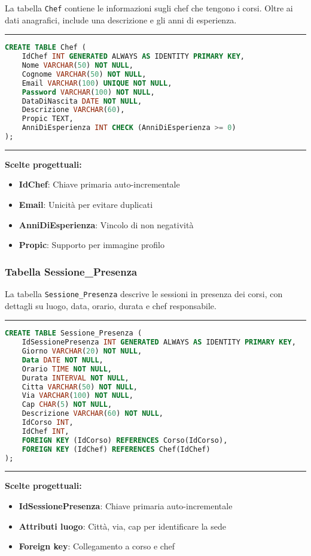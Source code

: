 La tabella \texttt{Chef} contiene le informazioni sugli chef che tengono i corsi. Oltre ai dati anagrafici, include una descrizione e gli anni di esperienza.

\noindent\rule{\textwidth}{0.4pt}
\begin{lstlisting}[language=SQL, style=sqlstyle]
CREATE TABLE Chef (
    IdChef INT GENERATED ALWAYS AS IDENTITY PRIMARY KEY,
    Nome VARCHAR(50) NOT NULL,
    Cognome VARCHAR(50) NOT NULL,
    Email VARCHAR(100) UNIQUE NOT NULL,
    Password VARCHAR(100) NOT NULL,
    DataDiNascita DATE NOT NULL,
    Descrizione VARCHAR(60),
    Propic TEXT,
    AnniDiEsperienza INT CHECK (AnniDiEsperienza >= 0)
);
\end{lstlisting}
\noindent\rule{\textwidth}{0.4pt}

\textbf{Scelte progettuali:}
\begin{itemize}
    \item \textbf{IdChef}: Chiave primaria auto-incrementale
    \item \textbf{Email}: Unicità per evitare duplicati
    \item \textbf{AnniDiEsperienza}: Vincolo di non negatività
    \item \textbf{Propic}: Supporto per immagine profilo
\end{itemize}

\subsubsection{Tabella Sessione\_Presenza}

La tabella \texttt{Sessione\_Presenza} descrive le sessioni in presenza dei corsi, con dettagli su luogo, data, orario, durata e chef responsabile.

\noindent\rule{\textwidth}{0.4pt}
\begin{lstlisting}[language=SQL, style=sqlstyle]
CREATE TABLE Sessione_Presenza (
    IdSessionePresenza INT GENERATED ALWAYS AS IDENTITY PRIMARY KEY,
    Giorno VARCHAR(20) NOT NULL,
    Data DATE NOT NULL,
    Orario TIME NOT NULL,
    Durata INTERVAL NOT NULL,
    Citta VARCHAR(50) NOT NULL,
    Via VARCHAR(100) NOT NULL,
    Cap CHAR(5) NOT NULL,
    Descrizione VARCHAR(60) NOT NULL,
    IdCorso INT,
    IdChef INT,
    FOREIGN KEY (IdCorso) REFERENCES Corso(IdCorso),
    FOREIGN KEY (IdChef) REFERENCES Chef(IdChef)
);
\end{lstlisting}
\noindent\rule{\textwidth}{0.4pt}

\textbf{Scelte progettuali:}
\begin{itemize}
    \item \textbf{IdSessionePresenza}: Chiave primaria auto-incrementale
    \item \textbf{Attributi luogo}: Città, via, cap per identificare la sede
    \item \textbf{Foreign key}: Collegamento a corso e chef
\end{itemize}


